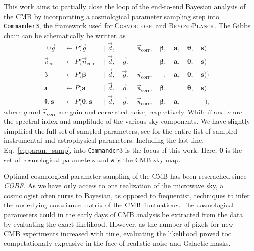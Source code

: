 \documentclass[twocolumn]{../common/aa}
\def\COBE{\emph{COBE}}
\def\commander{\texttt{Commander}}
\def\commanderthree{\texttt{Commander3}}
\newcommand{\g}[0]{\vec{g}}
\newcommand{\BP}{\textsc{BeyondPlanck}}
\newcommand{\cosmoglobe}{\textsc{Cosmoglobe}}
\newcommand{\data}{\vec d}
\newcommand{\ncorr}{\vec n_\mathrm{corr}}
\begin{document}
  This work aims to partially close the loop of the end-to-end Bayesian analysis of the CMB by incorporating a cosmological parameter sampling step into \commanderthree, the framework used for \cosmoglobe\ and \BP. The Gibbs chain can be schematically be written as  
  \begin{alignat}{10}
    \label{eq:gain_samp_dist}\g &\,\leftarrow          P(\g&\,               \mid \data, &\,\phantom{\g,} &\,\ncorr,&\,\boldsymbol\beta, &\,\boldsymbol a, &\,\boldsymbol \theta, &\, \boldsymbol s)\\
    \label{eq:ncorr_samp_dist} \ncorr &\,\leftarrow    P(\ncorr&\,        \mid \data, &\,\g, &\,\phantom{\ncorr,}  &\,\boldsymbol\beta, &\,\boldsymbol a, &\,\boldsymbol \theta, &\, \boldsymbol s)\\
    \label{eq:beta_samp}\boldsymbol\beta &\,\leftarrow                     P(\boldsymbol\beta &\, \mid \data, &\,\g, &\,\ncorr, &\,\phantom{\boldsymbol\beta}, &\,\boldsymbol a, &\,\boldsymbol \theta, &\, \boldsymbol s))\\
    \boldsymbol a &\,\leftarrow                                   P(\boldsymbol a&\,            \mid \data, &\,\g, &\,\ncorr, &\,\boldsymbol\beta, &\,\phantom{\boldsymbol a,} &\,\boldsymbol \theta, &\, \boldsymbol s)\\
    \boldsymbol\theta, \boldsymbol{s} &\,\leftarrow                             P(\boldsymbol\theta, \boldsymbol{s}&\,         \mid \data, &\,\g, &\,\ncorr, &\,\boldsymbol\beta, &\,\boldsymbol a,&\,\phantom{,}&\,\phantom{\boldsymbol\theta})\label{eq:param_samp},
    \end{alignat}
where $g$ and $\ncorr$ are gain and correlated noise, respectively. While $\beta$ and $a$ are the spectral index and amplitude of the various sky components. We have slightly simplified the full set of sampled parameters, see \cite{watts2023_dr1} for the entire list of sampled instrumental and astrophysical parameters. Including the last line, Eq.~\eqref{eq:param_samp}, into \commander3 is the focus of this work. Here, $\boldsymbol \theta$ is the set of cosmological parameters and $\boldsymbol s$ is the CMB sky map.

Optimal cosmological parameter sampling of the CMB has been reserached since \COBE \citep{smoot1995}. As we have only access to one realization of the microwave sky, a cosmologist often turns to Bayesian, as opposed to frequentist, techniques to infer the underlying covariance matrix of the CMB fluctuations. The cosmological parameters could in the early days of CMB analysis be extracted from the data by evaluating the exact likelihood. However, as the number of pixels for new CMB experiments increased with time, evaluating the likelihood proved too computationally expensive in the face of realistic noise and Galactic masks.
\end{document}
